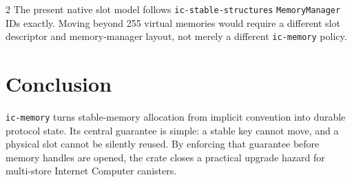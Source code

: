 \documentclass[11pt]{article}
\begin{document}
\begin{multicols}{2}
The present native slot model follows \texttt{ic-stable-structures}
\texttt{MemoryManager} IDs exactly. Moving beyond 255 virtual memories would
require a different slot descriptor and memory-manager layout, not merely a
different \texttt{ic-memory} policy.

\section{Conclusion}

\texttt{ic-memory} turns stable-memory allocation from implicit convention into
durable protocol state. Its central guarantee is simple: a stable key cannot
move, and a physical slot cannot be silently reused. By enforcing that guarantee
before memory handles are opened, the crate closes a practical upgrade hazard
for multi-store Internet Computer canisters.

\end{multicols}
\end{document}
